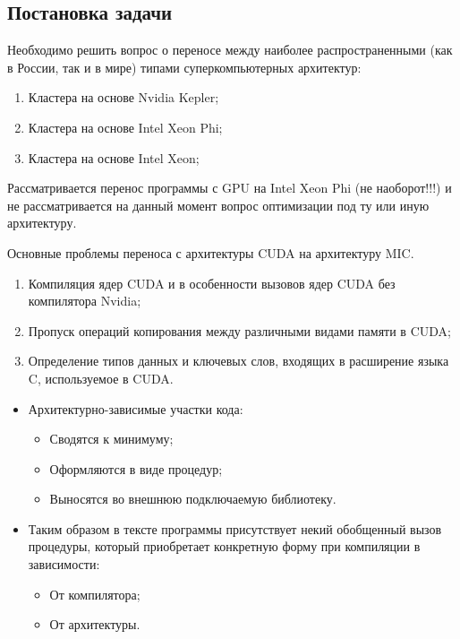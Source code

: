 \subsection{Постановка задачи}

Необходимо решить вопрос о переносе между наиболее распространенными (как в России, так и в мире) типами суперкомпьютерных архитектур:
\begin{enumerate}
	\item Кластера на основе Nvidia Kepler; 
	\item Кластера на основе Intel Xeon Phi;
	\item Кластера на основе Intel Xeon;
\end{enumerate}
Рассматривается перенос программы с GPU на Intel Xeon Phi (не наоборот!!!) и не рассматривается на данный момент вопрос оптимизации под ту или иную архитектуру.

Основные проблемы переноса с архитектуры CUDA\cite{CUDAweb,Boreskov,Sanders} на архитектуру MIC\cite{MorganPhi,FangPhi2014}.
\begin{enumerate}
	\item Компиляция ядер CUDA 
	и в особенности вызовов ядер CUDA без компилятора Nvidia;
	\item Пропуск операций копирования между различными видами памяти в CUDA;
	\item Определение типов данных и ключевых слов, входящих в расширение языка C, используемое в CUDA.
\end{enumerate}


\begin{itemize}
	\item Архитектурно-зависимые участки кода: 
	\begin{itemize}
		\item Сводятся к минимуму;
		\item Оформляются в виде процедур; 
		\item Выносятся во внешнюю подключаемую библиотеку.
	\end{itemize}
	\item Таким образом в тексте программы присутствует некий обобщенный вызов процедуры, который приобретает конкретную форму при компиляции в зависимости:
	\begin{itemize}
		\item От компилятора;
		\item От архитектуры.
	\end{itemize}
\end{itemize}

